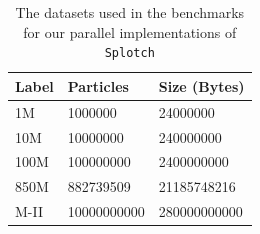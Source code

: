 


\begin{table}
\caption{The datasets used in the benchmarks for our parallel implementations of {\tt Splotch}}
\begin{center}
\begin{tabular}{|l|l|l|}
\hline
Label & 	Particles& 	Size (Bytes)  \\
\hline
1M   & 	1000000   & 24000000 \\
\hline
10M  & 	10000000  & 240000000 \\
\hline
100M & 	100000000 & 2400000000 \\
\hline
850M & 	882739509 & 21185748216 \\
\hline
M-II & 	10000000000 & 	280000000000 \\
\hline
\end{tabular}
\end{center}
\end{table}

